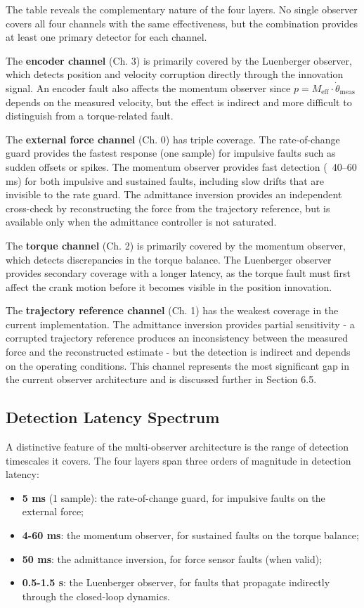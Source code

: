 The table reveals the complementary nature of the four layers. No single observer covers all four channels with the same effectiveness, but the combination provides at least one primary detector for each channel.
 
The \textbf{encoder channel} (Ch. 3) is primarily covered by the Luenberger observer, which detects position and velocity corruption directly through the innovation signal. An encoder fault also affects the momentum observer since $p = M_{\text{eff}} \cdot \dot{\theta}_{\text{meas}}$ depends on the measured velocity, but the effect is indirect and more difficult to distinguish from a torque-related fault.
 
The \textbf{external force channel} (Ch. 0) has triple coverage. The rate-of-change guard provides the fastest response (one sample) for impulsive faults such as sudden offsets or spikes. The momentum observer provides fast detection (~40--60 ms) for both impulsive and sustained faults, including slow drifts that are invisible to the rate guard. The admittance inversion provides an independent cross-check by reconstructing the force from the trajectory reference, but is available only when the admittance controller is not saturated.
 
The \textbf{torque channel} (Ch. 2) is primarily covered by the momentum observer, which detects discrepancies in the torque balance. The Luenberger observer provides secondary coverage with a longer latency, as the torque fault must first affect the crank motion before it becomes visible in the position innovation.
 
The \textbf{trajectory reference channel} (Ch. 1) has the weakest coverage in the current implementation. The admittance inversion provides partial sensitivity - a corrupted trajectory reference produces an inconsistency between the measured force and the reconstructed estimate - but the detection is indirect and depends on the operating conditions. This channel represents the most significant gap in the current observer architecture and is discussed further in Section 6.5.

\subsection{Detection Latency Spectrum}
A distinctive feature of the multi-observer architecture is the range of detection timescales it covers. The four layers span three orders of magnitude in detection latency:

\begin{itemize}
    \item \textbf{5 ms} (1 sample): the rate-of-change guard, for impulsive faults on the external force;
    \item \textbf{4-60 ms}: the momentum observer, for sustained faults on the torque balance;
    \item \textbf{50 ms}: the admittance inversion, for force sensor faults (when valid);
    \item \textbf{0.5-1.5 s}: the Luenberger observer, for faults that propagate indirectly through the closed-loop dynamics.
\end{itemize}


